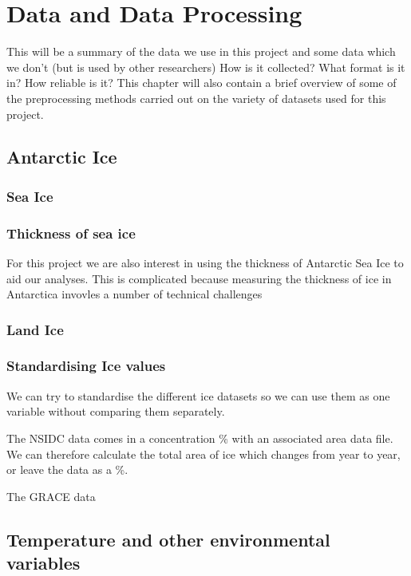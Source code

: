 \documentclass[../main.tex]{subfiles}
\begin{document}
\chapter{Data and Data Processing}
\label{chap:data}
This will be a summary of the data we use in this project and some data which we don't (but is used by other researchers)
How is it collected? What format is it in?
How reliable is it?
This chapter will also contain a brief overview of some of the preprocessing methods carried out on the variety of datasets used for this project. 

\section{Antarctic Ice}
\subsection*{Sea Ice}

\subsection*{Thickness of sea ice}
For this project we are also interest in using the thickness of Antarctic Sea Ice to aid our analyses. This is complicated because measuring the thickness of ice in Antarctica invovles a number of technical challenges

\subsection*{Land Ice}
\subsection*{Standardising Ice values}

We can try to standardise the different ice datasets so we can use them as one variable without comparing them separately.

The NSIDC data comes in a concentration \% with an associated area data file. We can therefore calculate the total area of ice which changes from year to year, or leave the data as a \%.

The GRACE data



\section{Temperature and other environmental variables}
\end{document}

